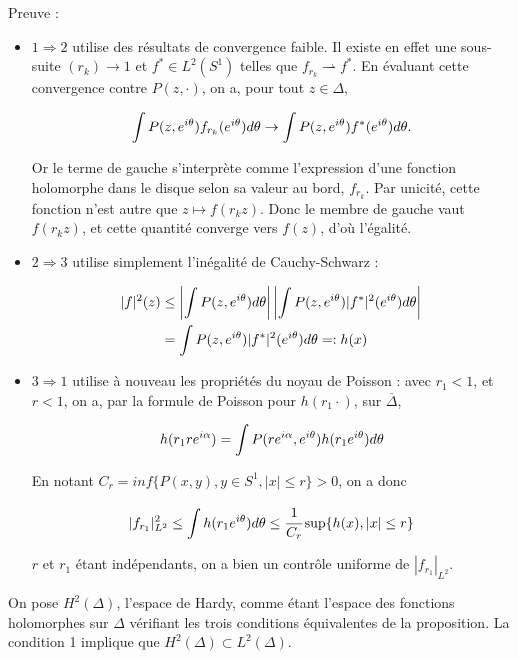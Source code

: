 Preuve : \begin{itemize}
\item $1 \Rightarrow 2$ utilise des résultats de convergence faible. Il existe en effet une sous-suite $(r_k) \to 1$ et $f^* \in L^2(S^1)$ telles que $f_{r_k} \rightharpoonup f^*$. En évaluant cette convergence contre $P(z, \cdot)$, on a, pour tout $z \in \Delta$, 

\begin{equation*}
	\int P(z,e^{i\theta})f_{r_k}(e^{i\theta})d\theta \to \int P(z,e^{i\theta})f^*(e^{i\theta})d\theta.
\end{equation*}

Or le terme de gauche s'interprète comme l'expression d'une fonction holomorphe dans le disque selon sa valeur au bord, $f_{r_k}$. Par unicité, cette fonction n'est autre que $z \mapsto f(r_kz)$. Donc le membre de gauche vaut $f(r_k z)$, et cette quantité converge vers $f(z)$, d'où l'égalité.
\item $2 \Rightarrow 3$ utilise simplement l'inégalité de Cauchy-Schwarz :

\begin{align*}
	|f|^2(z) &\leq \left|\int P(z,e^{i\theta})d\theta \right| \left|\int P(z,e^{i\theta})|f^*|^2(e^{i\theta})d\theta\right|\\
	&= \int P(z,e^{i\theta})|f^*|^2(e^{i\theta})d\theta =: h(x)
\end{align*}

\item $3 \Rightarrow 1$ utilise à nouveau les propriétés du noyau de Poisson : avec $r_1 < 1$, et $r < 1$, on a, par la formule de Poisson pour $h(r_1 \cdot)$, sur $\overline{\Delta}$, 

\begin{equation*}
	h(r_1re^{i\alpha})=\int P(re^{i\alpha}, e^{i\theta})h(r_1e^{i\theta})d\theta
\end{equation*}

En notant $C_r = inf\{P(x,y), y\in S^1, |x| \leq r\} > 0$, on a donc 

\begin{equation*}
	|f_{r_1}|_{L^2}^2 \leq \int h(r_1 e^{i\theta})d\theta \leq \cfrac{1}{C_r}\sup\{h(x), |x| \leq r\}
\end{equation*}

$r$ et $r_1$ étant indépendants, on a bien un contrôle uniforme de $|f_{r_1}|_{L^2}$.
\end{itemize}

On pose $H^2(\Delta)$, l'espace de Hardy, comme étant l'espace des fonctions holomorphes sur $\Delta$ vérifiant les trois conditions équivalentes de la proposition. La condition 1 implique que $H^2(\Delta) \subset L^2(\Delta)$. 

